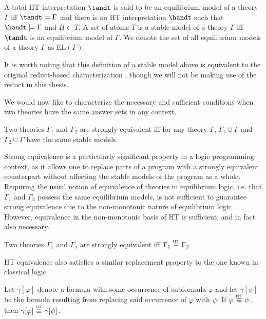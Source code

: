 \begin{definition}
  A total HT interpretation $\tandt$ is said to be an equilibrium
  model of a theory $\Gamma$ iff $\tandt \models \Gamma$ and there is
  no HT interpretation $\handt$ such that $\handt \models \Gamma$ and
  $H \subset T$. A set of atoms $T$ is a stable model of a theory
  $\Gamma$ iff $\tandt$ is an equilibrium model of $\Gamma$. We denote
  the set of all equilibrium models of a theory $\Gamma$ as
  $\text{EL}(\Gamma)$.
\end{definition}

It is worth noting that this definition of a stable model above is
equivalent to the original reduct-based characterization
\cite{lipeva01a}, though we will not be making use of the reduct in
this thesis. 

We would now like to characterize the necessary and sufficient
conditions when two theories have the same answer sets in any context.

\begin{definition}
  Two theories $\Gamma_1$ and $\Gamma_2$ are strongly equivalent iff for
  any theory $\Gamma$, $\Gamma_1 \cup \Gamma$ and
  $\Gamma_2 \cup \Gamma$ have the same stable models.
\end{definition}

Strong equivalence is a particularly significant property in a logic
programming context, as it allows one to replace parts of a program
with a strongly equivalent counterpart without affecting the stable
models of the program as a whole. Requiring the usual notion of
equivalence of theories in equilibrium logic, i.e. that $\Gamma_1$ and
$\Gamma_2$ possess the same equilibrium models, is not sufficient to
guarantee strong equivalence due to the non-monotonic nature of
equilibrium logic \cite{lipeva01a}.  However, equivalence in the
non-monotonic basis of HT is sufficient, and in fact also necessary.

\begin{proposition}
  Two theories $\Gamma_1$ and $\Gamma_2$ are strongly equivalent
  iff $\Gamma_1 \stackrel{\normalfont\mbox{\tiny HT}}{\equiv} \Gamma_2$
\end{proposition}

HT equivalence also satisfies a similar replacement property
to the one known in classical logic.

\begin{proposition}
  Let $\gamma[\varphi]$ denote a formula with some occurrence of
  subformula $\varphi$ and let $\gamma[\psi]$ be the formula resulting
  from replacing said occurrence of $\varphi$ with $\psi$. If
  $\varphi \stackrel{\normalfont\mbox{\tiny HT}}{\equiv} \psi$, then $\gamma[\varphi] \stackrel{\normalfont\mbox{\tiny HT}}{\equiv} \gamma[\psi]$.
\end{proposition}

